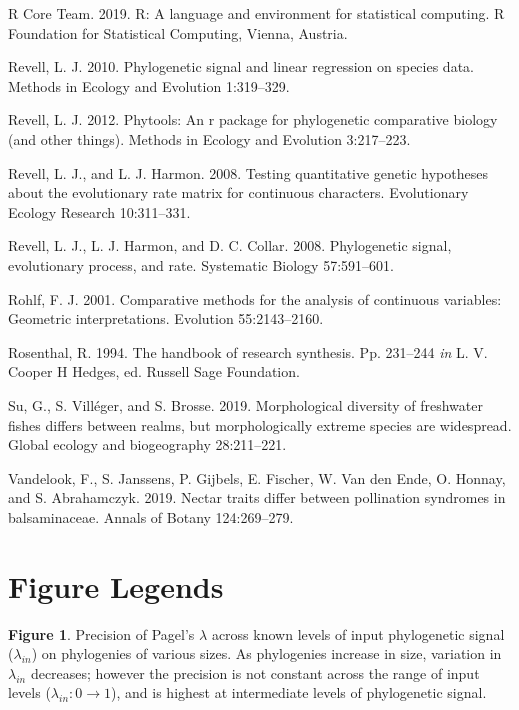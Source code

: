 \documentclass[
]{article}
\begin{document}
\leavevmode\hypertarget{ref-RCT}{}%
R Core Team. 2019. R: A language and environment for statistical
computing. R Foundation for Statistical Computing, Vienna, Austria.

\leavevmode\hypertarget{ref-Revell2010}{}%
Revell, L. J. 2010. Phylogenetic signal and linear regression on species
data. Methods in Ecology and Evolution 1:319--329.

\leavevmode\hypertarget{ref-Revell2012}{}%
Revell, L. J. 2012. Phytools: An r package for phylogenetic comparative
biology (and other things). Methods in Ecology and Evolution 3:217--223.

\leavevmode\hypertarget{ref-RevellHarmon2008}{}%
Revell, L. J., and L. J. Harmon. 2008. Testing quantitative genetic
hypotheses about the evolutionary rate matrix for continuous characters.
Evolutionary Ecology Research 10:311--331.

\leavevmode\hypertarget{ref-Revell_et_al2008}{}%
Revell, L. J., L. J. Harmon, and D. C. Collar. 2008. Phylogenetic
signal, evolutionary process, and rate. Systematic Biology 57:591--601.

\leavevmode\hypertarget{ref-Rohlf2001}{}%
Rohlf, F. J. 2001. Comparative methods for the analysis of continuous
variables: Geometric interpretations. Evolution 55:2143--2160.

\leavevmode\hypertarget{ref-Rosenthal1994}{}%
Rosenthal, R. 1994. The handbook of research synthesis. Pp. 231--244
\emph{in} L. V. Cooper H Hedges, ed. Russell Sage Foundation.

\leavevmode\hypertarget{ref-Su2019}{}%
Su, G., S. Villéger, and S. Brosse. 2019. Morphological diversity of
freshwater fishes differs between realms, but morphologically extreme
species are widespread. Global ecology and biogeography 28:211--221.

\leavevmode\hypertarget{ref-Vandelook2019}{}%
Vandelook, F., S. Janssens, P. Gijbels, E. Fischer, W. Van den Ende, O.
Honnay, and S. Abrahamczyk. 2019. Nectar traits differ between
pollination syndromes in balsaminaceae. Annals of Botany 124:269--279.

\newpage

\hypertarget{figure-legends}{%
\section{Figure Legends}\label{figure-legends}}

\textbf{Figure 1}. Precision of Pagel's \(\lambda\) across known levels
of input phylogenetic signal (\(\lambda_{in}\)) on phylogenies of
various sizes. As phylogenies increase in size, variation in
\(\lambda_{in}\) decreases; however the precision is not constant across
the range of input levels (\(\lambda_{in}: 0 \to 1\)), and is highest at
intermediate levels of phylogenetic signal. \hfill\break
\end{document}

